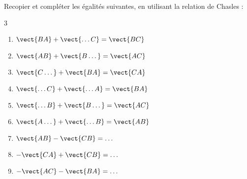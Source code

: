 Recopier et compléter les égalités suivantes, en utilisant la relation de Chasles :
\begin{multicols}{3}
\begin{enumerate}
\item $\vect{BA}+\vect{\dots{}C}=\vect{BC}$

\smallskip
\item $\vect{AB}+\vect{B\dots{}}=\vect{AC}$

\smallskip
\item $\vect{C\dots{}}+\vect{BA}=\vect{CA}$

\item $\vect{\dots{}C}+\vect{\dots{}A}=\vect{BA}$

\smallskip
\item $\vect{\dots{}B}+\vect{B\dots{}}=\vect{AC}$

\smallskip
\item $\vect{A\dots{}}+\vect{\dots{}B}=\vect{AB}$

\item $\vect{AB}-\vect{CB}=\dots{}$

\smallskip
\item $-\vect{CA}+\vect{CB}=\dots{}$

\smallskip
\item $-\vect{AC}-\vect{BA}=\dots{}$
\end{enumerate}
\end{multicols}

\exo

